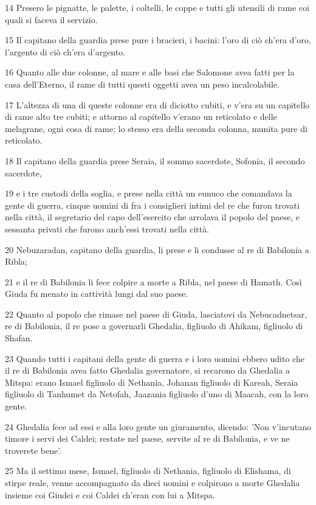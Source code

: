 \par 14 Presero le pignatte, le palette, i coltelli, le coppe e tutti gli utensili di rame coi quali si faceva il servizio.
\par 15 Il capitano della guardia prese pure i bracieri, i bacini: l'oro di ciò ch'era d'oro, l'argento di ciò ch'era d'argento.
\par 16 Quanto alle due colonne, al mare e alle basi che Salomone avea fatti per la casa dell'Eterno, il rame di tutti questi oggetti avea un peso incalcolabile.
\par 17 L'altezza di una di queste colonne era di diciotto cubiti, e v'era su un capitello di rame alto tre cubiti; e attorno al capitello v'erano un reticolato e delle melagrane, ogni cosa di rame; lo stesso era della seconda colonna, munita pure di reticolato.
\par 18 Il capitano della guardia prese Seraia, il sommo sacerdote, Sofonia, il secondo sacerdote,
\par 19 e i tre custodi della soglia, e prese nella città un eunuco che comandava la gente di guerra, cinque uomini di fra i consiglieri intimi del re che furon trovati nella città, il segretario del capo dell'esercito che arrolava il popolo del paese, e sessanta privati che furono anch'essi trovati nella città.
\par 20 Nebuzaradan, capitano della guardia, li prese e li condusse al re di Babilonia a Ribla;
\par 21 e il re di Babilonia li fece colpire a morte a Ribla, nel paese di Hamath. Così Giuda fu menato in cattività lungi dal suo paese.
\par 22 Quanto al popolo che rimase nel paese di Giuda, lasciatovi da Nebucadnetsar, re di Babilonia, il re pose a governarli Ghedalia, figliuolo di Ahikam, figliuolo di Shafan.
\par 23 Quando tutti i capitani della gente di guerra e i loro uomini ebbero udito che il re di Babilonia avea fatto Ghedalia governatore, si recarono da Ghedalia a Mitspa: erano Ismael figliuolo di Nethania, Johanan figliuolo di Kareah, Seraia figliuolo di Tanhumet da Netofah, Jaazania figliuolo d'uno di Maacah, con la loro gente.
\par 24 Ghedalia fece ad essi e alla loro gente un giuramento, dicendo: 'Non v'incutano timore i servi dei Caldei; restate nel paese, servite al re di Babilonia, e ve ne troverete bene'.
\par 25 Ma il settimo mese, Ismael, figliuolo di Nethania, figliuolo di Elishama, di stirpe reale, venne accompagnato da dieci uomini e colpirono a morte Ghedalia insieme coi Giudei e coi Caldei ch'eran con lui a Mitspa.
